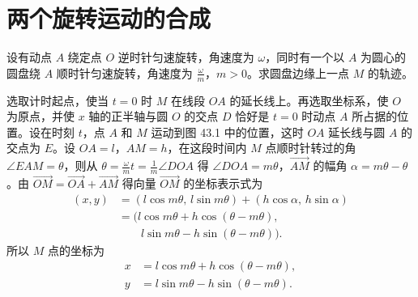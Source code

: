 \section{两个旋转运动的合成}

设有动点 $A$ 绕定点 $O$ 逆时针匀速旋转，角速度为 $\omega$，同时有一个以 $A$ 为圆心的圆盘绕 $A$ 顺时针匀速旋转，角速度为 $\frac{\omega}{m}$，$m>0$。求圆盘边缘上一点 $M$ 的轨迹。

选取计时起点，使当 $t=0$ 时 $M$ 在线段 $OA$ 的延长线上。再选取坐标系，使 $O$ 为原点，并使 $x$ 轴的正半轴与圆 $O$ 的交点 $D$ 恰好是 $t=0$ 时动点 $A$ 所占据的位置。设在时刻 $t$，点 $A$ 和 $M$ 运动到图 43.1 中的位置，这时 $OA$ 延长线与圆 $A$ 的交点为 $E$。设 $OA=l$，$AM=h$，在这段时间内 $M$ 点顺时针转过的角 $\angle EAM=\theta$，则从 $\theta=\frac{\omega}{m}t=\frac{1}{m}\angle DOA$ 得 $\angle DOA=m\theta$，$\overrightarrow{AM}$ 的幅角 $\alpha=m\theta-\theta$。由 $\overrightarrow{OM}=\overrightarrow{OA}+\overrightarrow{AM}$ 得向量 $\overrightarrow{OM}$ 的坐标表示式为
\begin{align*}
  (x,y) &= (l\cos m\theta,\, l\sin m\theta) + (h\cos\alpha,\, h\sin\alpha) \\
        &= \bigl(l\cos m\theta + h\cos(\theta - m\theta), \\
        &\qquad l\sin m\theta - h\sin(\theta - m\theta)\bigr).
\end{align*}
所以 $M$ 点的坐标为
\begin{align*}
  x &= l\cos m\theta + h\cos(\theta - m\theta), \\
  y &= l\sin m\theta - h\sin(\theta - m\theta).
\end{align*}


